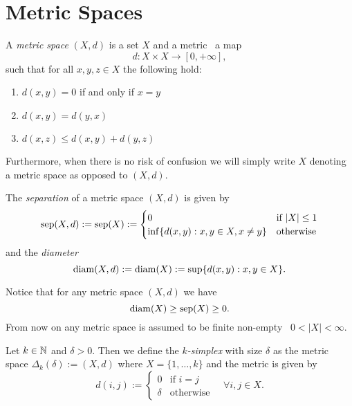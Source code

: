 \section{Metric Spaces}
\begin{definition}{}{}
A \emph{metric space} $(X,d)$ is a set $X$ and a metric \ie\ a map
\begin{equation*}
d: X \times X \to [0, +\infty],
\end{equation*}
such that for all $x,y,z \in X$ the following hold:
\begin{enumerate}
    \item $d(x,y) = 0$ if and only if $x = y$
    \item $d(x,y) = d(y,x)$
    \item $d(x,z) \leq d(x,y) + d(y,z)$
\end{enumerate}
\end{definition}
Furthermore, when there is no risk of confusion we will simply write $X$ denoting a metric space as opposed to $(X,d)$.

\begin{definition}{}{}
The \emph{separation} of a metric space $(X,d)$ is given by
\begin{equation*}
\mathrm{sep}(X,d) := \mathrm{sep}(X) := \begin{cases}
    0 & \text{if } |X| \le 1\\
    \inf\{d(x,y): x,y \in X, x \neq y\} & \text{otherwise}
\end{cases}
\end{equation*}
and the \emph{diameter}
\begin{equation*}
\mathrm{diam}(X,d) := \mathrm{diam}(X) := \sup\{d(x,y): x,y \in X\}.
\end{equation*}
\end{definition}

Notice that for any metric space $(X,d)$ we have
$$
\mathrm{diam}(X) \geq \mathrm{sep}(X) \ge 0.
$$
From now on any metric space is assumed to be finite non-empty \ie\ $0 < |X| < \infty$.


\begin{definition}{}{}
    Let $k \in \mathbb N$ and $\delta > 0$. Then we define the \emph{$k$-simplex} with size $\delta$ as the metric space $\Delta_k(\delta) := (X,d)$ where $X = \{1, \dots, k\}$ and the metric is given by
    $$
    d(i,j) := \begin{cases}
        0 & \text{if } i = j\\
        \delta & \text{otherwise}
    \end{cases} \quad \forall i,j \in X.
    $$
\end{definition}